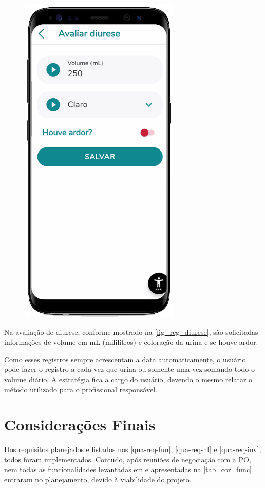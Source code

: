 \begin{figure}[htb]
\begin{minipage}{0.45\textwidth}
        \includegraphics[scale=0.66]{Imagens/desenvolvimento/app/reg_diurese.png}
    \end{minipage}
\end{figure}

Na avaliação de diurese, conforme mostrado na \autoref{fig_reg_diurese}, são solicitadas informações de volume em mL
(mililitros) e coloração da urina e se houve ardor.

Como esses registros sempre acrescentam a data automaticamente, o usuário pode fazer o registro
a cada vez que urina ou somente uma vez somando todo o volume diário. A estratégia fica a cargo do usuário,
devendo o mesmo relatar o método utilizado para o profissional responsável.

\section{Considerações Finais}

Dos requisitos planejados e listados nos \autoref{qua-req-fun}, \autoref{qua-req-nf} e \autoref{qua-req-inv},
todos foram implementados. Contudo, após reuniões de negociação com a PO,
nem todas as funcionalidades levantadas em  e apresentadas
na \autoref{tab_cor_func} entraram no planejamento, devido à viabilidade do projeto.

